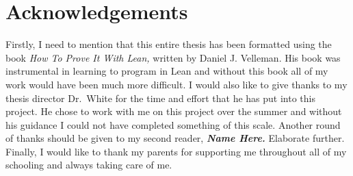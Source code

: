 \documentclass[
  letterpaper,
]{scrreprt}
\renewcommand*\contentsname{Table of contents}
\newcommand\contentsname{Table of contents}
\theoremstyle{remark}
\begin{document}
\newenvironment{ndfn}[1]
  {\renewcommand{\defnm}{#1}\begin{nameddfn}}
  {\end{nameddfn}}

\newenvironment{npf}[1]
  {\begin{proof}[#1]}
  {\end{proof}}


\let\oldgreater\textgreater
\renewcommand{\textgreater}{\null\oldgreater}   %

\ifdefined\Shaded\renewenvironment{Shaded}{\begin{tcolorbox}[enhanced, interior hidden, borderline west={3pt}{0pt}{shadecolor}, breakable, boxrule=0pt, sharp corners, frame hidden]}{\end{tcolorbox}}\fi

\renewcommand*\contentsname{Table of contents}
{
\hypersetup{linkcolor=}
\setcounter{tocdepth}{1}
\tableofcontents
}

\hypertarget{acknowledgements}{%
\chapter*{Acknowledgements}\label{acknowledgements}}



Firstly, I need to mention that this entire thesis has been formatted
using the book \emph{How To Prove It With Lean,} written by Daniel J.
Velleman. His book was instrumental in learning to program in Lean and
without this book all of my work would have been much more difficult. I
would also like to give thanks to my thesis director Dr.~White for the
time and effort that he has put into this project. He chose to work with
me on this project over the summer and without his guidance I could not
have completed something of this scale. Another round of thanks should
be given to my second reader, \textbf{\emph{Name Here.}} Elaborate
further. Finally, I would like to thank my parents for supporting me
throughout all of my schooling and always taking care of me.

\end{document}
